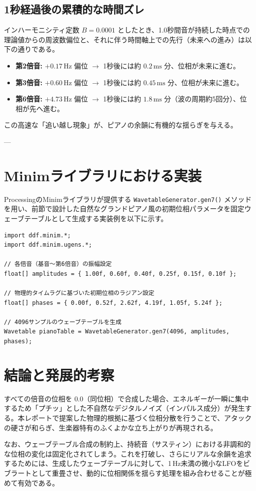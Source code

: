\documentclass[uplatex,dvipdfmx]{jlreq}
\begin{document}
\subsection{1秒経過後の累積的な時間ズレ}
インハーモニシティ定数 $B = 0.0001$ としたとき、1.0秒間音が持続した時点での理論値からの周波数偏位と、それに伴う時間軸上での先行（未来への進み）は以下の通りである。
\begin{itemize}
    \item \textbf{第2倍音:} $+0.17\,\text{Hz}$ 偏位 $\rightarrow$ 1秒後には約 $0.2\,\text{ms}$ 分、位相が未来に進む。
    \item \textbf{第3倍音:} $+0.60\,\text{Hz}$ 偏位 $\rightarrow$ 1秒後には約 $0.45\,\text{ms}$ 分、位相が未来に進む。
    \item \textbf{第6倍音:} $+4.73\,\text{Hz}$ 偏位 $\rightarrow$ 1秒後には約 $1.8\,\text{ms}$ 分（波の周期約5回分）、位相が先へ進む。
\end{itemize}
この高速な「追い越し現象」が、ピアノの余韻に有機的な揺らぎを与える。

---

\section{Minimライブラリにおける実装}
ProcessingのMinimライブラリが提供する \texttt{WavetableGenerator.gen7()} メソッドを用い、前節で設計した自然なグランドピアノ風の初期位相パラメータを固定ウェーブテーブルとして生成する実装例を以下に示す。

\begin{lstlisting}[caption=WavetableGeneratorを用いたピアノ音色波形の生成]
import ddf.minim.*;
import ddf.minim.ugens.*;

// 各倍音（基音〜第6倍音）の振幅設定
float[] amplitudes = { 1.00f, 0.60f, 0.40f, 0.25f, 0.15f, 0.10f };

// 物理的タイムラグに基づいた初期位相のラジアン設定
float[] phases = { 0.00f, 0.52f, 2.62f, 4.19f, 1.05f, 5.24f };

// 4096サンプルのウェーブテーブルを生成
Wavetable pianoTable = WavetableGenerator.gen7(4096, amplitudes, phases);
\end{lstlisting}

\section{結論と発展的考察}
すべての倍音の位相を $0.0$（同位相）で合成した場合、エネルギーが一瞬に集中するため「プチッ」とした不自然なデジタルノイズ（インパルス成分）が発生する。本レポートで提案した物理的根拠に基づく位相分散を行うことで、アタックの硬さが和らぎ、生楽器特有のふくよかな立ち上がりが再現される。

なお、ウェーブテーブル合成の制約上、持続音（サスティン）における非調和的な位相の変化は固定化されてしまう。これを打破し、さらにリアルな余韻を追求するためには、生成したウェーブテーブルに対して、1\,Hz未満の微小なLFOをビブラートとして重畳させ、動的に位相関係を揺らす処理を組み合わせることが極めて有効である。
\end{document}
